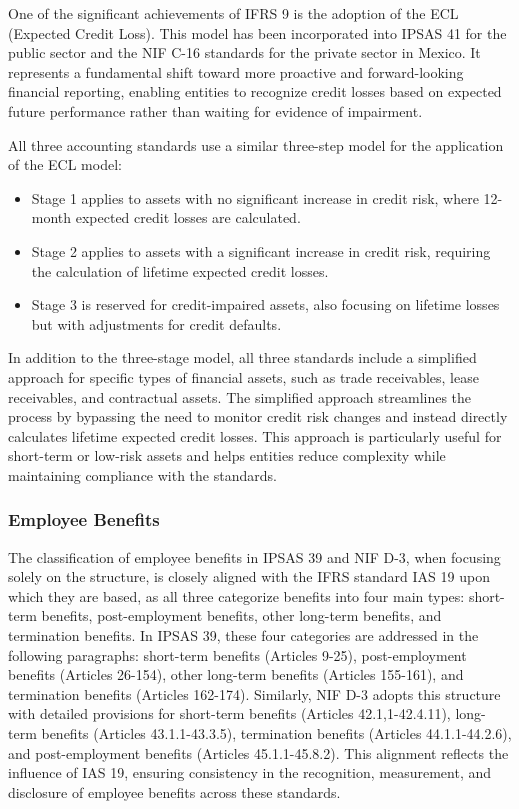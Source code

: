 \documentclass[10pt]{article}
\begin{document}
One of the significant achievements of IFRS 9 is the adoption of the ECL (Expected Credit Loss). This model has been incorporated into IPSAS 41 for the public sector and the NIF C-16 standards for the private sector in Mexico. It represents a fundamental shift toward more proactive and forward-looking financial reporting, enabling entities to recognize credit losses based on expected future performance rather than waiting for evidence of impairment.

All three accounting standards use a similar three-step model for the application of the ECL model:

\begin{itemize}
    \item Stage 1 applies to assets with no significant increase in credit risk, where 12-month expected credit losses are calculated.

    \item Stage 2 applies to assets with a significant increase in credit risk, requiring the calculation of lifetime expected credit losses.

    \item Stage 3 is reserved for credit-impaired assets, also focusing on lifetime losses but with adjustments for credit defaults.

\end{itemize}

In addition to the three-stage model, all three standards include a simplified approach for specific types of financial assets, such as trade receivables, lease receivables, and contractual assets. The simplified approach streamlines the process by bypassing the need to monitor credit risk changes and instead directly calculates lifetime expected credit losses. This approach is particularly useful for short-term or low-risk assets and helps entities reduce complexity while maintaining compliance with the standards.

\subsubsection{Employee Benefits}\label{subsubsec:employee_benefits}
The classification of employee benefits in IPSAS 39 and NIF D-3, when focusing solely on the structure, is closely aligned with the IFRS standard IAS 19 upon which they are based, as all three categorize benefits into four main types: short-term benefits, post-employment benefits, other long-term benefits, and termination benefits. In IPSAS 39, these four categories are addressed in the following paragraphs: short-term benefits (Articles 9-25), post-employment benefits (Articles 26-154), other long-term benefits (Articles 155-161), and termination benefits (Articles 162-174). Similarly, NIF D-3 adopts this structure with detailed provisions for short-term benefits (Articles 42.1,1-42.4.11), long-term benefits (Articles 43.1.1-43.3.5), termination benefits (Articles 44.1.1-44.2.6), and post-employment benefits (Articles 45.1.1-45.8.2). This alignment reflects the influence of IAS 19, ensuring consistency in the recognition, measurement, and disclosure of employee benefits across these standards.
\end{document}
